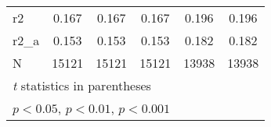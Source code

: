 {\begin{tabular}{l*{5}{c}}
r2          &       0.167         &       0.167         &       0.167         &       0.196         &       0.196         \\
r2\_a        &       0.153         &       0.153         &       0.153         &       0.182         &       0.182         \\
N           &       15121         &       15121         &       15121         &       13938         &       13938         \\
\hline\hline
\multicolumn{6}{l}{\footnotesize \textit{t} statistics in parentheses}\\
\multicolumn{6}{l}{\footnotesize \sym{*} \(p<0.05\), \sym{**} \(p<0.01\), \sym{***} \(p<0.001\)}\\
\end{tabular}
}
